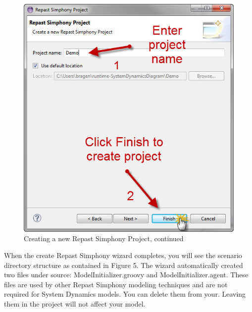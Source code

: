 \documentclass[11pt]{amsart}
\begin{document}
\begin{figure}[ht]
\begin{center}
\vspace{.2in}
\centerline {
\includegraphics[totalheight=0.35\textheight]{images/004.jpg}
}
\caption{Creating a new Repast Simphony Project, continued}
\label{fig:004}
\end{center}
\end{figure}

When the create Repast Simphony wizard completes, you will see the scenario directory structure as contained in Figure 5. The wizard automatically created two files under source: ModelInitializer.groovy and ModelInitializer.agent. These files are used by other Repast Simphony modeling techniques and are not required for System Dynamics models. You can delete them from your. Leaving them in the project will not affect your model.
\end{document}
